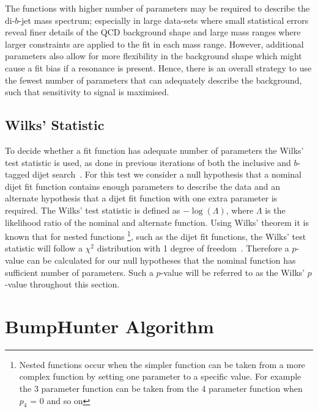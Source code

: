 The functions with higher number of parameters may be required to describe the di-$b$-jet mass spectrum;
especially in large data-sets where small statistical errors reveal finer details of the QCD background shape
and large mass ranges where larger constraints are applied to the fit in each mass range.
However, additional parameters also allow for more flexibility in the background shape
which might cause a fit bias if a resonance is present.
Hence, there is an overall strategy to use the fewest number of parameters
that can adequately describe the background, such that sensitivity to signal is maximised.

\subsection{Wilks' Statistic}
\label{sec:bkg-bkg_wilks}

To decide whether a fit function has adequate number of parameters the Wilks' test statistic is used,
as done in previous iterations of both the inclusive and $b$-tagged dijet search~\cite{dijet-mori16_paper,dibjet-mori16_paper}.
For this test we consider a null hypothesis that a nominal dijet fit function contains enough parameters to describe the data
and an alternate hypothesis that a dijet fit function with one extra parameter is required.
The Wilks' test statistic is defined as $-\log{(\Lambda)}$, where $\Lambda$ is the likelihood ratio of the nominal and alternate function.
Using Wilks' theorem it is known that for nested functions
\footnote{Nested functions occur when the simpler function can be taken from a more complex function by setting one parameter to a specific value.
  For example the 3 parameter function can be taken from the 4 parameter function when $p_4$ = 0 and so on},
such as the dijet fit functions,
the Wilks' test statistic will follow a $\chi^2$ distribution with 1 degree of freedom~\cite{dibjet-wilks}.
Therefore a $p$-value can be calculated for our null hypotheses that the nominal function has sufficient number of parameters.
Such a $p$-value will be referred to as the Wilks' $p$-value throughout this section.


\section{BumpHunter Algorithm}
\label{sec:bkg-bh}

